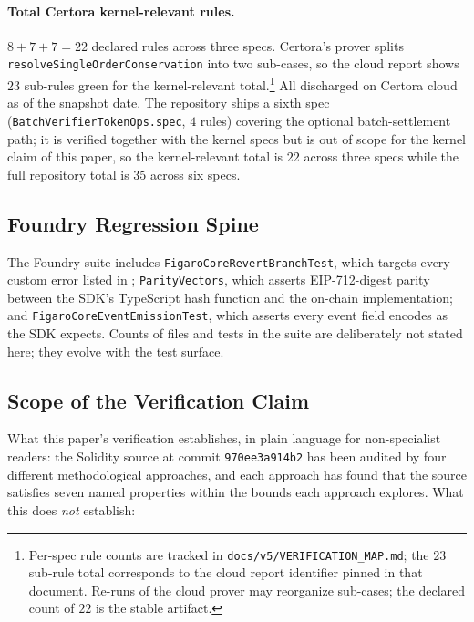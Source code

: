 \documentclass[11pt,a4paper]{article}
\theoremstyle{definition}
\theoremstyle{remark}
\begin{document}
\paragraph{Total Certora kernel-relevant rules.}
$8 + 7 + 7 = 22$ declared rules across three specs. Certora's prover
splits \texttt{resolveSingleOrderConservation} into two sub-cases, so
the cloud report shows $23$ sub-rules green for the kernel-relevant
total.\footnote{Per-spec rule counts are tracked in
\texttt{docs/v5/VERIFICATION\_MAP.md}; the $23$ sub-rule total
corresponds to the cloud report identifier pinned in that document.
Re-runs of the cloud prover may reorganize sub-cases; the declared
count of $22$ is the stable artifact.}
All discharged on Certora cloud as of the snapshot date. The
repository ships a sixth spec
(\texttt{BatchVerifierTokenOps.spec}, $4$ rules) covering the optional
batch-settlement path; it is verified together with the kernel
specs but is out of scope for the kernel claim of this paper, so
the kernel-relevant total is $22$ across three specs while the
full repository total is $35$ across six specs.

\subsection{Foundry Regression Spine}

The Foundry suite includes \texttt{FigaroCoreRevertBranchTest}, which
targets every custom error listed in ;
\texttt{ParityVectors}, which asserts EIP-712-digest parity between
the SDK's TypeScript hash function and the on-chain implementation;
and \texttt{FigaroCoreEventEmissionTest}, which asserts every event
field encodes as the SDK expects. Counts of files and tests in the
suite are deliberately not stated here; they evolve with the test
surface.

\subsection{Scope of the Verification Claim}
\label{sec:verification-scope}

What this paper's verification establishes, in plain language for
non-specialist readers: the Solidity source at commit
\texttt{970ee3a914b2} has been audited by four different
methodological approaches, and each approach has found that the
source satisfies seven named properties within the bounds each
approach explores. What this does \emph{not} establish:
\end{document}
